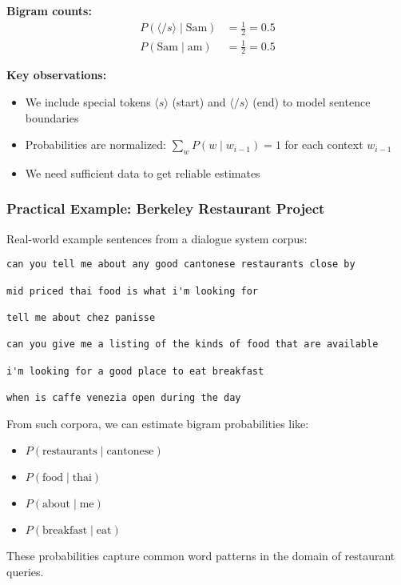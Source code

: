 \documentclass[11pt,a4paper]{article}
\theoremstyle{definition}
\theoremstyle{plain}
\theoremstyle{remark}
\begin{document}
\textbf{Bigram counts:}
\begin{align*}
P(\langle /s \rangle \mid \text{Sam}) &= \frac{1}{2} = 0.5 \\
P(\text{Sam} \mid \text{am}) &= \frac{1}{2} = 0.5
\end{align*}

\textbf{Key observations:}
\begin{itemize}
    \item We include special tokens $\langle s \rangle$ (start) and $\langle /s \rangle$ (end) to model sentence boundaries
    \item Probabilities are normalized: $\sum_{w} P(w \mid w_{i-1}) = 1$ for each context $w_{i-1}$
    \item We need sufficient data to get reliable estimates
\end{itemize}

\subsubsection{Practical Example: Berkeley Restaurant Project}

Real-world example sentences from a dialogue system corpus:

\begin{verbatim}
can you tell me about any good cantonese restaurants close by

mid priced thai food is what i'm looking for

tell me about chez panisse

can you give me a listing of the kinds of food that are available

i'm looking for a good place to eat breakfast

when is caffe venezia open during the day
\end{verbatim}

From such corpora, we can estimate bigram probabilities like:
\begin{itemize}
    \item $P(\text{restaurants} \mid \text{cantonese})$
    \item $P(\text{food} \mid \text{thai})$
    \item $P(\text{about} \mid \text{me})$
    \item $P(\text{breakfast} \mid \text{eat})$
\end{itemize}

These probabilities capture common word patterns in the domain of restaurant queries.
\end{document}
